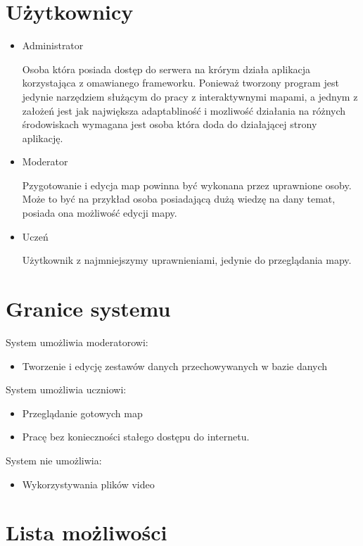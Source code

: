 \section{Użytkownicy}
\label{sec:uzytkownicy}

\begin{itemize}
\item
Administrator

Osoba która posiada dostęp do serwera na krórym działa aplikacja korzystająca z omawianego frameworku. Ponieważ tworzony program jest jedynie narzędziem służącym do pracy z interaktywnymi mapami, a jednym z założeń jest jak największa adaptabliność i mozliwość działania na różnych środowiskach wymagana jest osoba która doda do działającej strony aplikację.
\item
Moderator

Pzygotowanie i edycja map powinna być wykonana przez uprawnione osoby. Może to być na przykład osoba posiadającą dużą wiedzę na dany temat, posiada ona możliwość edycji mapy.
\item
Uczeń

Użytkownik z najmniejszymy uprawnieniami, jedynie do przeglądania mapy.
\end{itemize}

\section{Granice systemu}
\label{sec:granicesystemu}

System umożliwia moderatorowi:
\begin{itemize}
\item
Tworzenie i edycję zestawów danych przechowywanych w bazie danych

\end{itemize}

System umożliwia uczniowi:
\begin{itemize}
\item
Przeglądanie gotowych map

\item
Pracę bez konieczności stałego dostępu do internetu.
\end{itemize}

System nie umożliwia:
\begin{itemize}
\item
Wykorzystywania plików video

\end{itemize}

\section{Lista możliwości}
\label{sec:listamozliwosci}

